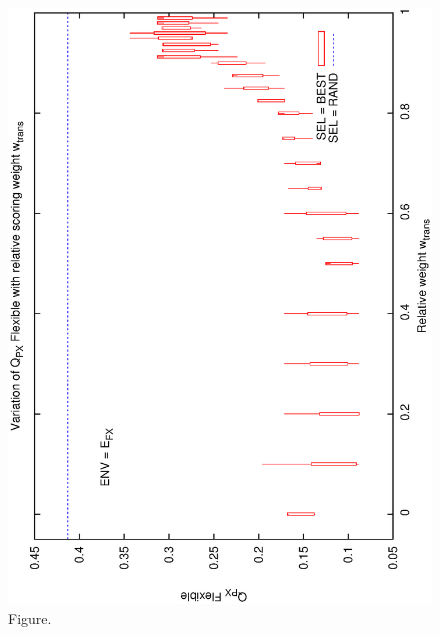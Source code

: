 \documentclass[12pt,a4paper]{article}
\begin{document}
\begin{figure}[htbp]
 \begin{center}
  \includegraphics[scale=1.0, angle=0]{figures/cs1_dw2_fpx.eps}
 \end{center}
  \caption[Figure.]
{Figure.}
\end{figure}
\clearpage
\end{document}
